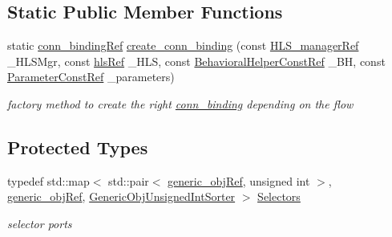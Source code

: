 \subsection*{Static Public Member Functions}
\begin{DoxyCompactItemize}
\item 
static \hyperlink{conn__binding_8hpp_a074d084f1d6f4503d815ba91304264a0}{conn\+\_\+binding\+Ref} \hyperlink{classconn__binding_af189b02ddea6e39918e098877b96b73c}{create\+\_\+conn\+\_\+binding} (const \hyperlink{hls__manager_8hpp_acd3842b8589fe52c08fc0b2fcc813bfe}{H\+L\+S\+\_\+manager\+Ref} \+\_\+\+H\+L\+S\+Mgr, const \hyperlink{hls_8hpp_a75d0c73923d0ddfa28c4843a802c73a7}{hls\+Ref} \+\_\+\+H\+LS, const \hyperlink{behavioral__helper_8hpp_aae973b54cac87eef3b27442aa3e1e425}{Behavioral\+Helper\+Const\+Ref} \+\_\+\+BH, const \hyperlink{Parameter_8hpp_a37841774a6fcb479b597fdf8955eb4ea}{Parameter\+Const\+Ref} \+\_\+parameters)
\begin{DoxyCompactList}\small\item\em factory method to create the right \hyperlink{classconn__binding}{conn\+\_\+binding} depending on the flow \end{DoxyCompactList}\end{DoxyCompactItemize}
\subsection*{Protected Types}
\begin{DoxyCompactItemize}
\item 
typedef std\+::map$<$ std\+::pair$<$ \hyperlink{generic__obj_8hpp_acb533b2ef8e0fe72e09a04d20904ca81}{generic\+\_\+obj\+Ref}, unsigned int $>$, \hyperlink{generic__obj_8hpp_acb533b2ef8e0fe72e09a04d20904ca81}{generic\+\_\+obj\+Ref}, \hyperlink{classGenericObjUnsignedIntSorter}{Generic\+Obj\+Unsigned\+Int\+Sorter} $>$ \hyperlink{classconn__binding_a1994d72baf506bcb1d94e0cfede4258b}{Selectors}
\begin{DoxyCompactList}\small\item\em selector ports \end{DoxyCompactList}\end{DoxyCompactItemize}
